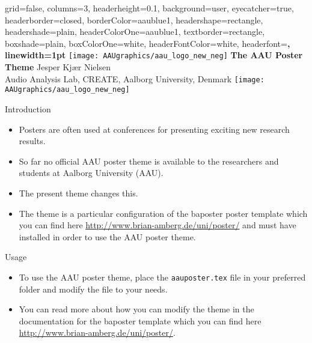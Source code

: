 \documentclass[a0paper,portrait]{baposter}
\newcommand{\alert}[1]{{\color{aaublue1}#1}}
\begin{document}
\begin{poster}{
  grid=false,
  columns=3,
  headerheight=0.1\textheight,
  background=user,
  eyecatcher=true,
  headerborder=closed,
  borderColor=aaublue1,
  headershape=rectangle,
  headershade=plain,
  headerColorOne=aaublue1,
  textborder=rectangle,
  boxshade=plain,
  boxColorOne=white,
  headerFontColor=white,
  headerfont=\Large\sf\bf,
  linewidth=1pt
}
{
  \texttt{[image: AAUgraphics/aau\_logo\_new\_neg]}
}
{\color{white}\bf
  The AAU Poster Theme
}
{\color{white}\small
  \vspace{1em} Jesper Kjær Nielsen\\[0.5em]
  Audio Analysis Lab, CREATE, Aalborg University, Denmark
}
{
  \texttt{[image: AAUgraphics/aau\_logo\_new\_neg]}
}


\begin{posterbox}[name=intro,column=0,row=0]{Introduction}
\begin{itemize}
  \item Posters are often used at conferences for presenting exciting new research results.
  \item So far no official AAU poster theme is available to the researchers and students at Aalborg University (AAU).
  \item The present theme changes this.
  \item The theme is a particular configuration of the \alert{baposter} poster template \cite{baposter} which you can find here \url{http://www.brian-amberg.de/uni/poster/} and must have installed in order to use the AAU poster theme.
\end{itemize}
\end{posterbox}

\begin{posterbox}[name=usage,column=0,below=intro]{Usage}
\begin{itemize}
  \item To use the AAU poster theme, place the {\tt aauposter.tex} file in your preferred folder and modify the file to your needs.
  \item You can read more about how you can modify the theme in the documentation for the baposter template which you can find here \url{http://www.brian-amberg.de/uni/poster/}.
\end{itemize}
\end{posterbox}


\end{poster}
\end{document}
